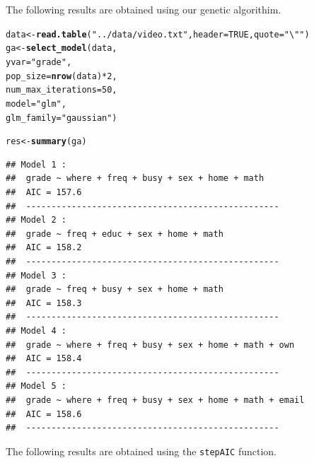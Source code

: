 \documentclass[11pt]{article}
\makeatletter
\newcommand{\hlnum}[1]{\textcolor[rgb]{0.686,0.059,0.569}{#1}}%
\newcommand{\hlstr}[1]{\textcolor[rgb]{0.192,0.494,0.8}{#1}}%
\newcommand{\hlopt}[1]{\textcolor[rgb]{0,0,0}{#1}}%
\newcommand{\hlstd}[1]{\textcolor[rgb]{0.345,0.345,0.345}{#1}}%
\newcommand{\hlkwb}[1]{\textcolor[rgb]{0.69,0.353,0.396}{#1}}%
\newcommand{\hlkwc}[1]{\textcolor[rgb]{0.333,0.667,0.333}{#1}}%
\newcommand{\hlkwd}[1]{\textcolor[rgb]{0.737,0.353,0.396}{\textbf{#1}}}%
\newenvironment{kframe}{%
 \def\at@end@of@kframe{}%
 \ifinner\ifhmode%
  \def\at@end@of@kframe{\end{minipage}}%
  \begin{minipage}{\columnwidth}%
 \fi\fi%
 \def\FrameCommand##1{\hskip\@totalleftmargin \hskip-\fboxsep
 \colorbox{shadecolor}{##1}\hskip-\fboxsep
     \hskip-\linewidth \hskip-\@totalleftmargin \hskip\columnwidth}%
 \MakeFramed {\advance\hsize-\width
   \@totalleftmargin\z@ \linewidth\hsize
   \@setminipage}}%
 {\par\unskip\endMakeFramed%
 \at@end@of@kframe}
\newenvironment{knitrout}{}{} %
\makeatother
\begin{document}
The following results are obtained using our genetic algorithim.

\begin{knitrout}
\color{fgcolor}\begin{kframe}
\begin{alltt}
\hlstd{data} \hlkwb{<-} \hlkwd{read.table}\hlstd{(}\hlstr{"../data/video.txt"}\hlstd{,} \hlkwc{header} \hlstd{=} \hlnum{TRUE}\hlstd{,} \hlkwc{quote} \hlstd{=} \hlstr{"\textbackslash{}""}\hlstd{)}
\hlstd{ga} \hlkwb{<-} \hlkwd{select_model}\hlstd{(data,}
                   \hlkwc{yvar} \hlstd{=} \hlstr{"grade"}\hlstd{,}
                   \hlkwc{pop_size} \hlstd{=} \hlkwd{nrow}\hlstd{(data)}\hlopt{*}\hlnum{2}\hlstd{,}
                   \hlkwc{num_max_iterations} \hlstd{=} \hlnum{50}\hlstd{,}
                   \hlkwc{model} \hlstd{=} \hlstr{"glm"}\hlstd{,}
                   \hlkwc{glm_family} \hlstd{=} \hlstr{"gaussian"}\hlstd{)}
\end{alltt}
\end{kframe}
\end{knitrout}

\begin{knitrout}
\color{fgcolor}\begin{kframe}
\begin{alltt}
\hlstd{res} \hlkwb{<-} \hlkwd{summary}\hlstd{(ga)}
\end{alltt}
\begin{verbatim}
## Model 1 :
##  grade ~ where + freq + busy + sex + home + math 
##  AIC = 157.6 
##  --------------------------------------------------
## Model 2 :
##  grade ~ freq + educ + sex + home + math 
##  AIC = 158.2 
##  --------------------------------------------------
## Model 3 :
##  grade ~ freq + busy + sex + home + math 
##  AIC = 158.3 
##  --------------------------------------------------
## Model 4 :
##  grade ~ where + freq + busy + sex + home + math + own 
##  AIC = 158.4 
##  --------------------------------------------------
## Model 5 :
##  grade ~ where + freq + busy + sex + home + math + email 
##  AIC = 158.6 
##  --------------------------------------------------
\end{verbatim}
\end{kframe}
\end{knitrout}

The following results are obtained using the \texttt{stepAIC} function.
\end{document}
